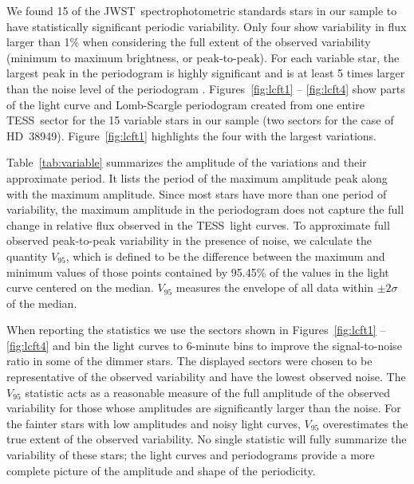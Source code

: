 \documentclass[twocolumn]{aastex631}
\newcommand{\webb}{JWST}
\newcommand{\tess}{TESS}
\begin{document}
We found 15 of the \webb\ spectrophotometric standards stars in our sample to have statistically significant periodic variability. Only four show variability in flux larger than 1\% when considering the full extent of the observed variability (minimum to maximum brightness, or peak-to-peak).  For each variable star, the largest peak in the periodogram is highly significant and is at least 5 times larger than the noise level of the periodogram \citep{KjeldsenBedding1995, Baran2021}. Figures~\ref{fig:lcft1} -- \ref{fig:lcft4} show parts of the light curve and Lomb-Scargle periodogram created from one entire \tess\ sector for the 15 variable stars in our sample (two sectors for the case of HD~38949). 
Figure~\ref{fig:lcft1} highlights the four with the largest variations.  

Table~\ref{tab:variable} summarizes the amplitude of the variations and their approximate period.  It lists the period of the maximum amplitude peak along with the maximum amplitude. Since most stars have more than one period of variability, the maximum amplitude in the periodogram does not capture the full change in relative flux observed in the \tess\ light curves. To approximate full observed peak-to-peak variability in the presence of noise, we calculate the quantity $V_{95}$, which is defined to be the difference between the maximum and minimum values of those points contained by 95.45\% of the values in the light curve centered on the median.  $V_{95}$ measures the envelope of all data within $\pm 2\sigma$ of the median. 


When reporting the statistics we use the sectors shown in Figures~\ref{fig:lcft1} -- \ref{fig:lcft4} and bin the light curves to 6-minute bins to improve the signal-to-noise ratio in some of the dimmer stars. The displayed sectors were chosen to be representative of the observed variability and have the lowest observed noise. The $V_{95}$ statistic acts as a reasonable measure of the full amplitude of the observed variability for those whose amplitudes are significantly larger than the noise.  For the fainter stars with low amplitudes and noisy light curves, $V_{95}$ overestimates the true extent of the observed variability. No single statistic will fully summarize the variability of these stars; the light curves and periodograms provide a more complete picture of the  amplitude and shape of the periodicity.
\end{document}

